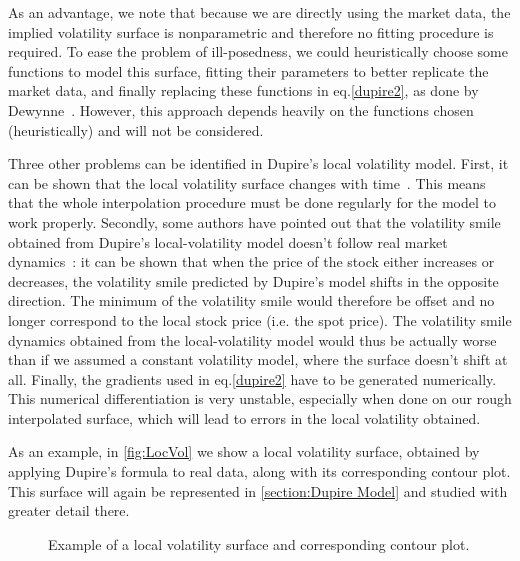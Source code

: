 As an advantage, we note that because we are directly using the market data, the implied volatility surface is nonparametric and therefore no fitting procedure is required. To ease the problem of ill-posedness, we could heuristically choose some functions to model this surface, fitting their parameters to better replicate the market data, and finally replacing these functions in eq.\eqref{dupire2}, as done by Dewynne~\citep{dewynne}. However, this approach depends heavily on the functions chosen (heuristically) and will not be considered.



Three other problems can be identified in Dupire's local volatility model.
First, it can be shown that the local volatility surface changes with time~\citep{Wilmott}. This means that the whole interpolation procedure must be done regularly for the model to work properly.
Secondly, some authors have pointed out that the volatility smile obtained from Dupire's local-volatility model doesn't follow real market dynamics~\citep{Hagan}: it can be shown that when the price of the stock either increases or decreases, the volatility smile predicted by Dupire's model shifts in the opposite direction. The minimum of the volatility smile would therefore be offset and no longer correspond to the local stock price (i.e. the spot price). The volatility smile dynamics obtained from the local-volatility model would thus be actually worse than if we assumed a constant volatility model, where the surface doesn't shift at all.
Finally, the gradients used in eq.\eqref{dupire2} have to be generated numerically. This numerical differentiation is very unstable, especially when done on our rough interpolated surface, which will lead to errors in the local volatility obtained.

As an example, in \autoref{fig:LocVol} we show a local volatility surface, obtained by applying Dupire's formula to real data, along with its corresponding contour plot. This surface will again be represented in \autoref{section:Dupire Model} and studied with greater detail there.
\begin{figure}[!htb]
  \begin{subfigmatrix}{2}
  \end{subfigmatrix}
    \caption[Example of a local volatility surface and corresponding contour plot.]{Example of a local volatility surface and corresponding contour plot.}\label{fig:LocVol}
\end{figure}  

